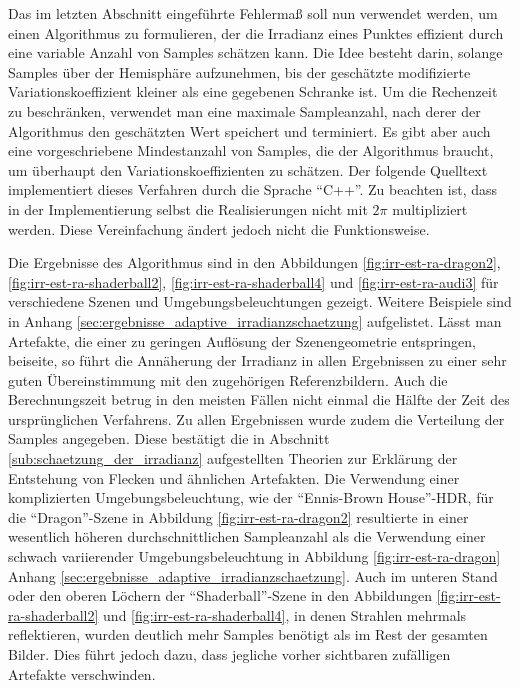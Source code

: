 		Das im letzten Abschnitt eingeführte Fehlermaß soll nun verwendet werden, um einen Algorithmus zu formulieren, der die Irradianz eines Punktes effizient durch eine variable Anzahl von Samples schätzen kann.
		Die Idee besteht darin, solange Samples über der Hemisphäre aufzunehmen, bis der geschätzte modifizierte Variationskoeffizient kleiner als eine gegebenen Schranke ist.
		Um die Rechenzeit zu beschränken, verwendet man eine maximale Sampleanzahl, nach derer der Algorithmus den geschätzten Wert speichert und terminiert.
		Es gibt aber auch eine vorgeschriebene Mindestanzahl von Samples, die der Algorithmus braucht, um überhaupt den Variationskoeffizienten zu schätzen.
		Der folgende Quelltext implementiert dieses Verfahren durch die Sprache \enquote{C++}.
		Zu beachten ist, dass in der Implementierung selbst die Realisierungen nicht mit $2\pi$ multipliziert werden.
		Diese Vereinfachung ändert jedoch nicht die Funktionsweise.

		

		Die Ergebnisse des Algorithmus sind in den Abbildungen \ref{fig:irr-est-ra-dragon2}, \ref{fig:irr-est-ra-shaderball2}, \ref{fig:irr-est-ra-shaderball4} und \ref{fig:irr-est-ra-audi3} für verschiedene Szenen und Umgebungsbeleuchtungen gezeigt.
		Weitere Beispiele sind in Anhang \ref{sec:ergebnisse_adaptive_irradianzschaetzung} aufgelistet.
		Lässt man Artefakte, die einer zu geringen Auflösung der Szenengeometrie entspringen, beiseite, so führt die Annäherung der Irradianz in allen Ergebnissen zu einer sehr guten Übereinstimmung mit den zugehörigen Referenzbildern.
		Auch die Berechnungszeit betrug in den meisten Fällen nicht einmal die Hälfte der Zeit des ursprünglichen Verfahrens.
		Zu allen Ergebnissen wurde zudem die Verteilung der Samples angegeben.
		Diese bestätigt die in Abschnitt \ref{sub:schaetzung_der_irradianz} aufgestellten Theorien zur Erklärung der Entstehung von Flecken und ähnlichen Artefakten.
		Die Verwendung einer komplizierten Umgebungsbeleuchtung, wie der \enquote{Ennis-Brown House}-HDR, für die \enquote{Dragon}-Szene in Abbildung \ref{fig:irr-est-ra-dragon2} resultierte in einer wesentlich höheren durchschnittlichen Sampleanzahl als die Verwendung einer schwach variierender Umgebungsbeleuchtung in Abbildung \ref{fig:irr-est-ra-dragon} Anhang \ref{sec:ergebnisse_adaptive_irradianzschaetzung}.
		Auch im unteren Stand oder den oberen Löchern der \enquote{Shaderball}-Szene in den Abbildungen \ref{fig:irr-est-ra-shaderball2} und \ref{fig:irr-est-ra-shaderball4}, in denen Strahlen mehrmals reflektieren, wurden deutlich mehr Samples benötigt als im Rest der gesamten Bilder.
		Dies führt jedoch dazu, dass jegliche vorher sichtbaren zufälligen Artefakte verschwinden.

